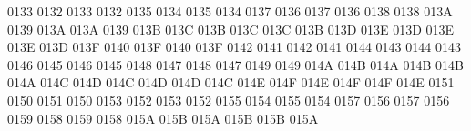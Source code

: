  0133 0132 %
 0133 0132 %
 0135 0134 %
 0135 0134 %
 0137 0136 %
 0137 0136 %
 0138 0138 %
 013A 0139 %
\setcclcucx 013A 013A 0139 %
\setcclcucx 013B 013C 013B %
\setcclcucx 013C 013C 013B %
\setcclcucx 013D 013E 013D %
\setcclcucx 013E 013E 013D %
\setcclcucx 013F 0140 013F %
 0140 013F %
 0142 0141 %
 0142 0141 %
 0144 0143 %
 0144 0143 %
 0146 0145 %
 0146 0145 %
 0148 0147 %
 0148 0147 %
 0149 0149 %
\setcclcucx 014A 014B 014A %
\setcclcucx 014B 014B 014A %
\setcclcucx 014C 014D 014C %
\setcclcucx 014D 014D 014C %
\setcclcucx 014E 014F 014E %
\setcclcucx 014F 014F 014E %
 0151 0150 %
 0151 0150 %
 0153 0152 %
 0153 0152 %
 0155 0154 %
 0155 0154 %
 0157 0156 %
 0157 0156 %
 0159 0158 %
 0159 0158 %
\setcclcucx 015A 015B 015A %
\setcclcucx 015B 015B 015A %
